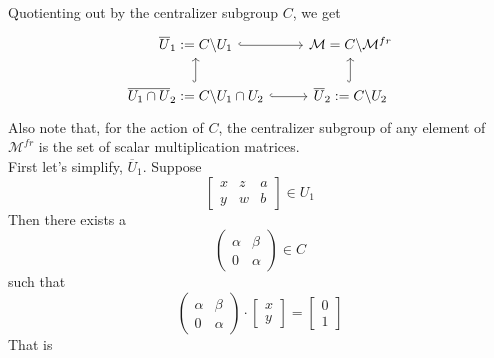\begin{example}
\begin{displaymath}
\begin{tikzcd}
\end{tikzcd} 
\end{displaymath}\\
Quotienting out by the centralizer subgroup $C$, we get
\begin{displaymath}
\begin{tikzcd}
  \overline{U}_1:=C\backslash U_1\arrow[r,hookrightarrow] & \mathcal{M}=C\backslash\mathcal{M}^{fr} \\
  \overline{U_1 \cap U}_2:=C\backslash U_1 \cap U_2 \arrow[hookrightarrow]{u} \arrow[r,hookrightarrow] & \overline{U}_2:=C\backslash U_2 \arrow[hookrightarrow]{u} 
\end{tikzcd} 
\end{displaymath}
Also note that, for the action of $C$, the centralizer subgroup of any element of $\mathcal{M}^{fr}$ is the set of scalar multiplication matrices.\\
First let's simplify, $\overline{U}_1$. Suppose
\[
	\begin{bmatrix}
	x&z&a\\
	y&w&b
	\end{bmatrix}
	\in U_1
\]
Then there exists a 
\[
	\begin{pmatrix}
		\alpha & \beta\\
		0 & \alpha 
	\end{pmatrix}
	\in
	C
\]
such that
\[
	\begin{pmatrix}
		\alpha & \beta\\
		0 & \alpha 	
	\end{pmatrix}
	\cdot
	\begin{bmatrix}
		x\\
		y
	\end{bmatrix}
	=
	\begin{bmatrix}
		0\\
		1
	\end{bmatrix}	
\] 
That is 


\end{example}
